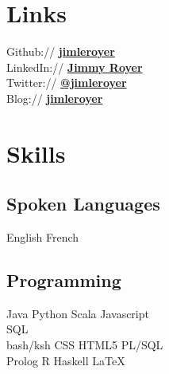 \documentclass[letterpaper]{deedy-resume} %
\begin{document}
\begin{minipage}[t]{0.33\textwidth} %


\section{Links} 

Github:// \href{https://github.com/jimleroyer/}{\bf jimleroyer} \\
LinkedIn:// \href{https://ca.linkedin.com/in/jimleroyer/}{\bf Jimmy Royer} \\
Twitter:// \href{https://twitter.com/jimleroyer}{\bf @jimleroyer} \\
Blog:// \href{http://jimleroyer.wordpress.com/}{\bf jimleroyer}

\sectionspace %


\section{Skills}

\subsection{Spoken Languages}

English \textbullet{} French

\sectionspace %

\subsection{Programming}

Java \textbullet{} Python \textbullet{} Scala \textbullet{} Javascript \\
SQL \\
bash/ksh \textbullet{} CSS \textbullet{} HTML5 \textbullet{} PL/SQL \\
Prolog \textbullet{} R \textbullet{} Haskell \textbullet{} \LaTeX\

\sectionspace %


\end{minipage}
\end{document}
